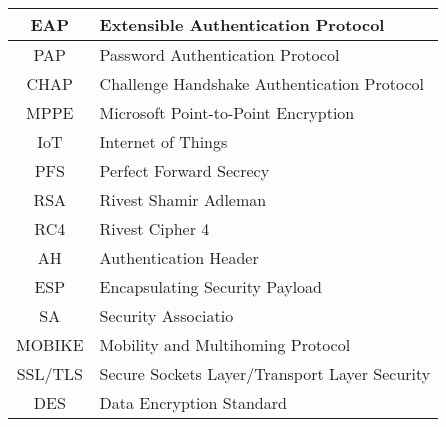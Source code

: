 \begin{table}[ht!]
\begin{tabular}{|c|l|}
EAP              &     Extensible Authentication Protocol     \\ \hline
PAP               &   Password Authentication Protocol                                                \\ \hline
CHAP              &     Challenge Handshake Authentication Protocol       \\ \hline
MPPE              &     Microsoft Point-to-Point Encryption      \\ \hline
IoT              &     Internet of Things      \\ \hline
PFS              &      Perfect Forward Secrecy    \\ \hline
RSA              &      Rivest Shamir Adleman     \\ \hline
RC4              &       Rivest Cipher 4    \\ \hline
AH              &     Authentication Header      \\ \hline
ESP              &     Encapsulating Security Payload   \\\hline
SA              &     Security Associatio    \\ \hline
MOBIKE         &     Mobility and Multihoming Protocol  \\\hline
SSL/TLS           &    Secure Sockets Layer/Transport Layer Security        \\ \hline
DES        &    Data Encryption Standard       \\ \hline

\end{tabular}
\end{table}

\newpage


